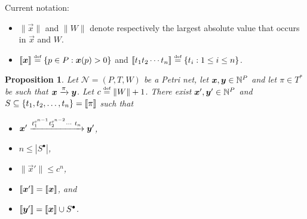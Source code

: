 \newcommand{\pn}{\mathcal{N}}
\newcommand{\norm}[1]{\lVert#1\rVert}
\newcommand{\pre}[1]{\ensuremath{{^\bullet #1}}}
\newcommand{\post}[1]{\ensuremath{{#1^\bullet}}}
\newcommand{\prepost}[1]{\ensuremath{{^\bullet {#1} ^\bullet}}}
\theoremstyle{plain}
\newtheorem{proposition}[theorem]{Proposition}

Current notation:
\begin{itemize}
  \item $\norm{\vec{x}}$ and $\norm{W}$ denote respectively the
    largest absolute value that occurs in $\vec{x}$ and $W$.

  \item $\llbracket\bm{x}\rrbracket \stackrel{\scriptscriptstyle\text{def}}{=} \{p \in P : \bm{x}(p) > 0\}$ and
    $\llbracket t_1 t_2 \cdots t_n\rrbracket \stackrel{\scriptscriptstyle\text{def}}{=} \{t_i : 1 \leq i \leq n\}$.
\end{itemize}

\begin{proposition}\label{prop:short:saturation}
  Let $\pn = (P, T, W)$ be a Petri net, let $\bm{x}, \bm{y} \in
  \mathbb{N}^P$ and let $\pi \in T^*$ be such that $\bm{x} \xrightarrow{\pi}
  \bm{y}$. Let $c \defeq \norm{W} + 1$. There exist $\bm{x}',
  \bm{y}' \in \mathbb{N}^P$ and $S \subseteq \{t_1, t_2, \ldots, t_n\} =
  \llbracket\pi\rrbracket$ such that
  \begin{itemize}
  \item $\bm{x}' \xrightarrow{t_1^{c^{n-1}} t_2^{c^{n-2}} \cdots\ t_n}
    \bm{y}'$,

  \item $n \leq |\post{S}|$,

  \item $\norm{\vec{x}'} \leq c^n$,

  \item $\llbracket\bm{x}'\rrbracket = \llbracket\bm{x}\rrbracket$, and 

  \item $\supp{\vec{y}'} = \supp{\vec{x}} \cup \post{S}$.
  \end{itemize}
\end{proposition}

